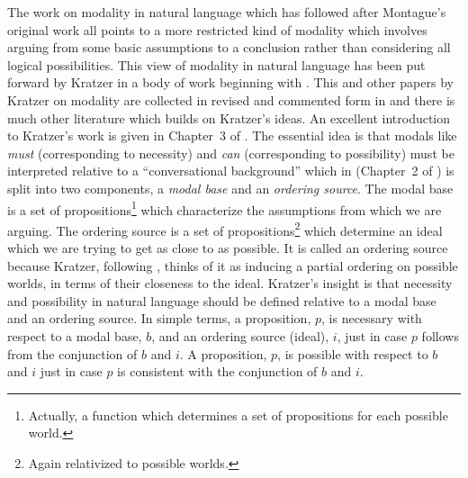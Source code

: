 The work on modality in natural language which has followed after
Montague's original work all points to a more restricted kind of
modality which involves arguing from some basic assumptions to a
conclusion rather than considering all logical possibilities.  This
view of modality in natural language has been put forward by Kratzer
in a body of work beginning with \cite{Kratzer1977}.  This and other
papers by Kratzer on modality are collected in revised and commented
form in \cite{Kratzer2012} and there is much other literature which
builds on Kratzer's ideas.  An excellent introduction to Kratzer's
work is given in Chapter~3 of \cite{Portner2009}.  The essential idea is that modals like
\textit{must} (corresponding to necessity) and \textit{can}
(corresponding to possibility) must be interpreted relative to a
``conversational background'' which in \cite{Kratzer1981} (Chapter~2
of \citealp{Kratzer2012}) is split into two components, a \textit{modal base} and an
\textit{ordering source}. The modal base is a set of
propositions\footnote{Actually, a function which determines a set of
  propositions for each possible world.} which characterize the
assumptions from which we are arguing. The ordering source is a set of
propositions\footnote{Again relativized to possible worlds.} which determine an ideal which we are trying to get as
close to as possible.  It is called an ordering source because
Kratzer, following \cite{Lewis1981}, thinks of it as inducing a
partial ordering on possible worlds, in terms of their closeness to
the ideal. Kratzer's insight is that necessity and possibility in
natural language should be defined relative to a modal base and an
ordering source.  In simple terms, a proposition, $p$, is necessary with
respect to a modal base, $b$, and an ordering source (ideal), $i$,
just in case $p$
follows from the conjunction of $b$ and $i$.  A proposition, $p$, is
possible with respect to $b$ and $i$ just in case $p$ is consistent
with the conjunction of $b$ and $i$.

